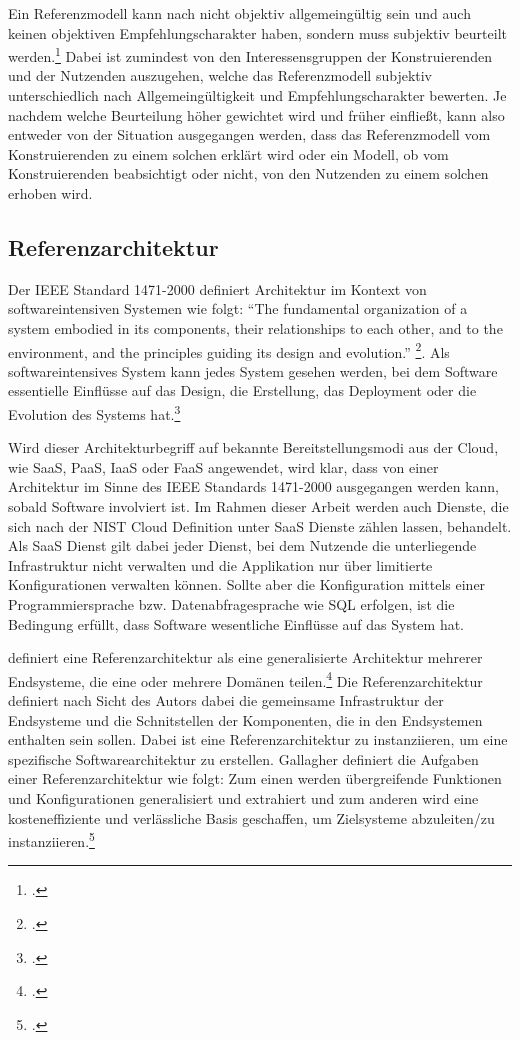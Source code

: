 Ein Referenzmodell kann nach \citeauthor{vomBrocke.2003} nicht objektiv allgemeingültig sein und auch keinen objektiven Empfehlungscharakter haben, sondern muss subjektiv beurteilt werden.\footcite[Vgl. auch im Folgenden][31~f.]{vomBrocke.2003}  Dabei ist zumindest von den Interessensgruppen der Konstruierenden und der Nutzenden auszugehen, welche das Referenzmodell subjektiv unterschiedlich nach Allgemeingültigkeit und Empfehlungscharakter bewerten. Je nachdem welche Beurteilung höher gewichtet wird und früher einfließt, kann also entweder von der Situation ausgegangen werden, dass das Referenzmodell vom Konstruierenden zu einem solchen erklärt wird oder ein Modell, ob vom Konstruierenden beabsichtigt oder nicht, von den Nutzenden zu einem solchen erhoben wird.


\subsection{Referenzarchitektur}
Der IEEE Standard 1471-2000 definiert Architektur im Kontext von softwareintensiven Systemen wie folgt:
\enquote{The fundamental organization of a system embodied in its components, their relationships
to each other, and to the environment, and the principles guiding its design and evolution.} \footcite[][3]{IEEEComputerSociety.2000}. Als softwareintensives System kann jedes System gesehen werden, bei dem Software essentielle Einflüsse auf das Design, die Erstellung, das Deployment oder die Evolution des Systems hat.\footcite[Vgl.][1]{IEEEComputerSociety.2000}

Wird dieser Architekturbegriff auf bekannte Bereitstellungsmodi aus der Cloud, wie \ac{SaaS}, \ac{PaaS}, \ac{IaaS} oder \ac{FaaS} angewendet, wird klar, dass von einer Architektur im Sinne des IEEE Standards 1471-2000 ausgegangen werden kann, sobald Software involviert ist. Im Rahmen dieser Arbeit werden auch Dienste, die sich nach der NIST Cloud Definition unter \ac{SaaS} Dienste zählen lassen, behandelt. Als \ac{SaaS} Dienst gilt dabei jeder Dienst, bei dem Nutzende die unterliegende Infrastruktur nicht verwalten und die Applikation nur über limitierte Konfigurationen verwalten können. Sollte aber die Konfiguration mittels einer Programmiersprache bzw. Datenabfragesprache wie \ac{SQL} erfolgen, ist die Bedingung erfüllt, dass Software wesentliche Einflüsse auf das System hat.


\citeauthor{Gallagher.2000} definiert eine Referenzarchitektur als eine generalisierte Architektur mehrerer Endsysteme, die eine oder mehrere Domänen teilen.\footcite[Vgl. auch im Folgenden][3]{Gallagher.2000} Die Referenzarchitektur definiert nach Sicht des Autors dabei die gemeinsame Infrastruktur der Endsysteme und die Schnitstellen der Komponenten, die in den Endsystemen enthalten sein sollen. Dabei ist eine Referenzarchitektur zu instanziieren, um eine spezifische Softwarearchitektur zu erstellen. Gallagher definiert die Aufgaben einer Referenzarchitektur wie folgt: Zum einen werden übergreifende Funktionen und Konfigurationen generalisiert und extrahiert und zum anderen wird eine kosteneffiziente und verlässliche Basis geschaffen, um Zielsysteme abzuleiten/zu instanziieren.\footcite[Vgl.][3]{Gallagher.2000}

